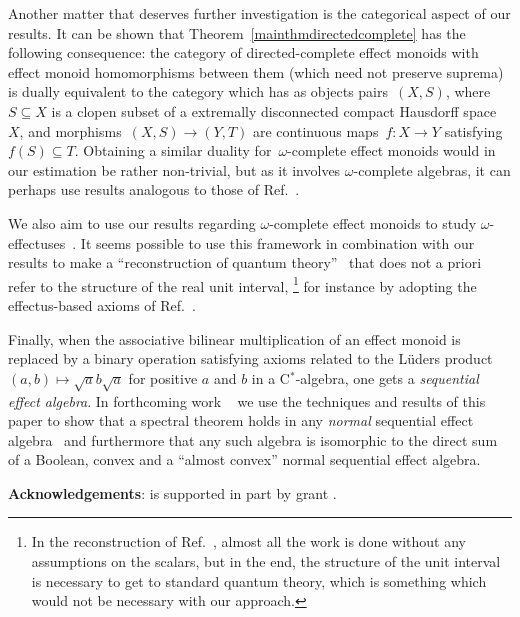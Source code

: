 \documentclass[10pt,conference]{IEEEtran}
\theoremstyle{definition}
\begin{document}
Another matter that deserves further investigation
    is the categorical aspect of our results.
It can be shown that Theorem~\ref{mainthmdirectedcomplete}
    has the following consequence:
    the category of directed-complete effect monoids
    with effect monoid homomorphisms 
    between them (which need not preserve suprema)
    is dually equivalent to the category
        which has as objects pairs~$(X,S)$,
            where~$S \subseteq X$ is a clopen subset
            of a extremally disconnected compact Hausdorff space~$X$,
    and morphisms~$(X,S) \to (Y,T)$
           are continuous maps~$f\colon X \to Y$
            satisfying~$f(S) \subseteq T$.
Obtaining a similar duality for~$\omega$-complete
effect monoids
    would in our estimation be rather non-trivial, but as it involves $\omega$-complete algebras, it can perhaps use results analogous to those of Ref.~\cite{furber2017unrestricted}.
        
We also aim to use our results regarding 
	$\omega$-complete effect monoids to study 
	$\omega$-effectuses~\cite{kentathesis}.
It seems possible to use this framework in combination 
	with our results to make a 
	``reconstruction of quantum theory''~\cite{hardy2001quantum,chiribella2011informational} 
	that does not a priori refer to the structure 
	of the real unit interval,
	\footnote{In the reconstruction of	
	Ref.~\cite{tull2016reconstruction}, almost all the work 
	is done without any assumptions on the scalars, 
	but in the end, the structure of the unit interval 
	is necessary to get to standard quantum theory, 
	which is something which would not be necessary 
	with our approach.} 
	for instance by adopting the effectus-based axioms 
	of Ref.~\cite{wetering2018reconstruction}.

Finally, when the associative bilinear multiplication of 
    an effect monoid is replaced by a binary operation 
    satisfying axioms related to the L\"uders product
    $(a,b)\mapsto \sqrt{a}b\sqrt{a}$ 
    for positive $a$ and $b$ in a C$^*$-algebra, 
    one gets a \emph{sequential effect algebra}. 
In forthcoming work %
~\cite{second} 
we use the techniques 
    and results of this paper
    to show that a spectral theorem holds in any
    \emph{normal} sequential effect algebra~\cite{gudder2002sequential}
    and furthermore that any such algebra is isomorphic 
    to the direct sum of a
    Boolean, convex and a ``almost convex'' 
    normal sequential effect algebra.

\noindent \textbf{Acknowledgements}:  is supported in part by  grant .



\end{document}

